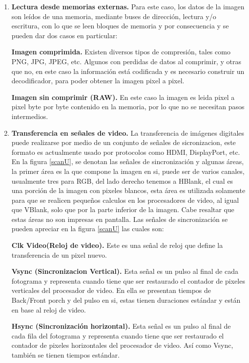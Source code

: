 \documentclass[twoside,spanish,ESP,MSc]{plantillaLabUPV}
\theoremstyle{definition}
\begin{document}
\begin{enumerate}
 \item \textbf{Lectura desde memorias externas.}
 Para este caso, los datos de la imagen son leídos de una memoria, mediante buses de dirección, lectura y/o escritura, con lo que se leen bloques de memoria y por consecuencia  y se pueden dar dos casos en particular:
 
 \checkmark\textbf{Imagen comprimida.} Existen diversos tipos de compresión, tales como PNG, JPG, JPEG, etc. Algunos con perdidas de datos al comprimir, y otras  que no, en este caso la información está codificada y es necesario construir un decodificador, para poder obtener la imagen pixel a pixel. 
 
 \checkmark\textbf{Imagen sin comprimir (RAW).} En este caso la imagen es leida pixel a pixel byte por byte contenido en la memoria, por lo que no se necesitan pasos intermedios.
 
 
 \item \textbf{Transferencia en señales de video.} 
 La transferencia de imágenes digitales puede realizarse por medio de un conjunto de señales de sicronizacion, este formato es actualmente usado por protocolos como HDMI, DisplayPort, etc. En la figura \ref{scanU}, se denotan las señales de sincronización y algunas áreas, la primer área es la que compone la imagen en si, puede ser de varios canales, usualmente tres para RGB, del lado derecho tenemos a HBlank, el cual es una porción de la imagen con pixeles blancos, esta área es utilizada solamente para que se realicen pequeños calculos en los procesadores de video, al igual que VBlank, solo que por la parte inferior de la imagen. Cabe resaltar que estas áreas no son impresas en pantalla. Las señales de sincronización se pueden apreciar en la figura \ref{scanU} las cuales son: 
 
  \checkmark\textbf{Clk Video(Reloj de video).} Este es una señal de reloj que define la transferencia de un pixel nuevo.
 
 \checkmark\textbf{Vsync (Sincronizacion Vertical).} Esta señal es un pulso al final de cada fotograma y representa cuando tiene que ser restaurado el contador de pixeles verticales del procesador de video. En ella se presentan tiempos de Back/Front porch y del pulso en si, estas tienen duraciones estándar y están en base al reloj de video.
 
 \checkmark\textbf{Hsync (Sincronización horizontal).} Esta señal es un pulso al final de cada fila del fotograma y representa cuando tiene que ser restaurado el contador de pixeles horizontales del procesador de video. Así como Vsync, también se tienen tiempos estándar.
  

\end{enumerate}
\end{document}

